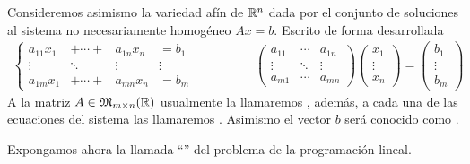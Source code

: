 Consideremos asimismo la variedad afín de $\mathbb{R}^n$ dada por el conjunto de soluciones al sistema no necesariamente homogéneo $Ax=b$. Escrito de forma desarrollada
\begin{equation*}
\begin{array}{cc}
\left\{\begin{array}{cccc}
a_{11}x_1&+\cdots+&a_{1n}x_n&=b_1\\
\vdots &\ddots &\vdots &\vdots\\
a_{1m}x_1&+\cdots+&a_{mn}x_n&=b_m
\end{array}\right.\qquad&\qquad\begin{pmatrix}
a_{11} & \cdots & a_{1n}\\
\vdots & \ddots & \vdots\\
a_{m1} & \cdots & a_{mn}
\end{pmatrix}\begin{pmatrix}
x_1\\
\vdots\\
x_n
\end{pmatrix}=\begin{pmatrix}
b_1\\
\vdots\\
b_m
\end{pmatrix}
\end{array}
\end{equation*}
A la matriz $A\in\mathfrak{M}_{m\times n}(\mathbb{R})$ usualmente la llamaremos , además, a cada una de las ecuaciones del sistema las llamaremos . Asimismo el vector $b$ será conocido como .

Expongamos ahora la llamada ``'' del problema de la programación lineal.

